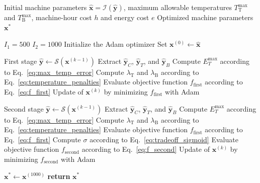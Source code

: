 \begin{algorithm}[ht]
	\footnotesize
	\caption{Inverse model process parameters optimization}
	\label{alg:optimizer}
	\begin{algorithmic}[1]
		
		\Require Initial machine parameters $\mathbf{\hat{x}}=\mathcal{I}(\mathbf{\hat{y}})$, maximum allowable temperatures $T_\text{T}^{\max}$ and $T_\text{B}^{\max}$, machine-hour cost $h$ and energy cost $e$
		\Ensure Optimized machine parameters $\mathbf{x}^{*}$
		
		\State $I_1 = 500$
		\label{alg:opt_init_start}
		\State $I_2 = 1000$
		\State Initialize the Adam optimizer
		\State Set $\mathbf{x}^{(0)} \gets \mathbf{\hat{x}}$
		\label{alg:opt_init_end}
		
		 \Comment First stage
		\label{alg:opt_first_start}
		\State $\mathbf{\hat{y}} \gets \mathcal{S}(\mathbf{x}^{(k-1)})$
		\State Extract $\mathbf{\hat{y}}_C$, $\mathbf{\hat{y}}_T$, and $\mathbf{\hat{y}}_B$
		\State Compute $E_T^{\max}$ according to Eq.~\ref{eq:max_temp_error}
		\State Compute $\lambda_\text{T}$ and $\lambda_\text{B}$ according to Eq.~\ref{eq:temperature_penalties}
		\State Evaluate objective function $f_{\text{first}}$ according to Eq.~\ref{eq:f_first}
		\State Update of $\mathbf{x}^{(k)}$ by minimizing $f_{\text{first}}$ with Adam
		\EndFor
		\label{alg:opt_first_end}
		

		 \Comment Second stage
		\label{alg:opt_second_start}
		\State $\mathbf{\hat{y}} \gets \mathcal{S}(\mathbf{x}^{(k-1)})$
		\State Extract $\mathbf{\hat{y}}_C$, $\mathbf{\hat{y}}_T$, and $\mathbf{\hat{y}}_B$
		\State Compute $E_T^{\max}$ according to Eq.~\ref{eq:max_temp_error}
		\State Compute $\lambda_\text{T}$ and $\lambda_\text{B}$ according to Eq.~\ref{eq:temperature_penalties}
		\State Evaluate objective function $f_{\text{first}}$ according to Eq.~\ref{eq:f_first}
		\State Compute $\sigma$ according to Eq.~\ref{eq:tradeoff_sigmoid}
		\State Evaluate objective function $f_{\text{second}}$ according to Eq.~\ref{eq:f_second}
		\State Update of $\mathbf{x}^{(k)}$ by minimizing $f_{\text{second}}$ with Adam
		\EndFor
		\label{alg:opt_second_end}
		
		\State $\mathbf{x}^{*} \gets \mathbf{x}^{(1000)}$
		\label{alg:opt_output_start}
		\State \textbf{return} $\mathbf{x}^{*}$
		\label{alg:opt_output_end}
		
	\end{algorithmic}
\end{algorithm}

